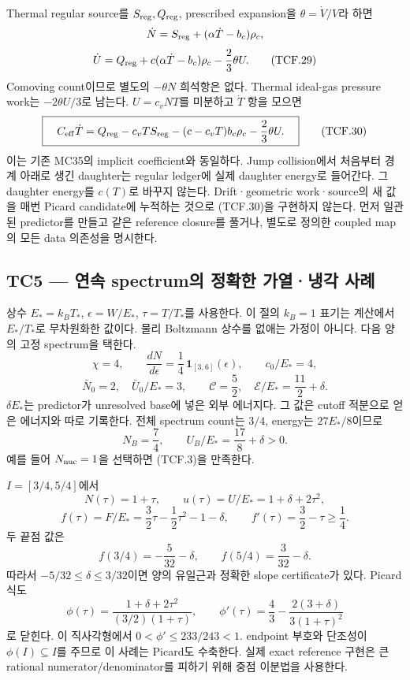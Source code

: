 \documentclass[11pt,a4paper]{article}
\begin{document}
Thermal regular source를 \(S_{\rm reg},Q_{\rm reg}\), prescribed expansion을 \(\theta=\dot V/V\)라 하면 \[
\dot N=S_{\rm reg}+(\alpha\dot T-b_c)\rho_c,
\] \[
\dot U=Q_{\rm reg}+c(\alpha\dot T-b_c)\rho_c
-\frac23\theta U.
\tag{TCF.29}
\] Comoving count이므로 별도의 \(-\theta N\) 희석항은 없다. Thermal ideal-gas pressure work는 \(-2\theta U/3\)로 남는다. \(U=c_vNT\)를 미분하고 \(\dot T\) 항을 모으면 \[
\boxed{\quad
C_{\rm eff}\dot T=
Q_{\rm reg}-c_vTS_{\rm reg}
-(c-c_vT)b_c\rho_c-\frac23\theta U .
\quad}
\tag{TCF.30}
\] 이는 기존 MC35의 implicit coefficient와 동일하다. Jump collision에서 처음부터 경계 아래로 생긴 daughter는 regular ledger에 실제 daughter energy로 들어간다. 그 daughter energy를 \(c(T)\)로 바꾸지 않는다. Drift·geometric work·source의 새 값을 매번 Picard candidate에 누적하는 것으로 (TCF.30)을 구현하지 않는다. 먼저 일관된 predictor를 만들고 같은 reference closure를 풀거나, 별도로 정의한 coupled map의 모든 data 의존성을 명시한다.

\hypertarget{tc5-uxc5f0uxc18d-spectrumuxc758-uxc815uxd655uxd55c-uxac00uxc5f4uxb0c9uxac01-uxc0acuxb840}{%
\subsection{TC5 --- 연속 spectrum의 정확한 가열·냉각 사례}\label{tc5-uxc5f0uxc18d-spectrumuxc758-uxc815uxd655uxd55c-uxac00uxc5f4uxb0c9uxac01-uxc0acuxb840}}

상수 \(E_*=k_BT_*\), \(\epsilon=W/E_*\), \(\tau=T/T_*\)를 사용한다. 이 절의 \(k_B=1\) 표기는 계산에서 \(E_*/T_*\)로 무차원화한 값이다. 물리 Boltzmann 상수를 없애는 가정이 아니다. 다음 양의 고정 spectrum을 택한다. \[
\chi=4,\qquad
\frac{dN}{d\epsilon}=\frac14\,\mathbf1_{[3,6]}(\epsilon),\qquad
c_0/E_*=4,
\] \[
\bar N_0=2,\quad \bar U_0/E_*=3,\qquad
\mathscr C=\frac52,\quad
\mathscr E/E_*=\frac{11}{2}+\delta .
\tag{TCF.31}
\] \(\delta E_*\)는 predictor가 unresolved base에 넣은 외부 에너지다. 그 값은 cutoff 적분으로 얻은 에너지와 따로 기록한다. 전체 spectrum count는 \(3/4\), energy는 \(27E_*/8\)이므로 \[
N_B=\frac74,\qquad U_B/E_*=\frac{17}{8}+\delta>0 .
\tag{TCF.32}
\] 예를 들어 \(N_{\rm nuc}=1\)을 선택하면 (TCF.3)을 만족한다.

\(I=[3/4,5/4]\)에서 \[
N(\tau)=1+\tau,\qquad u(\tau)=U/E_*=1+\delta+2\tau^2,
\] \[
f(\tau)=F/E_*=
\frac32\tau-\frac12\tau^2-1-\delta,\qquad
f'(\tau)=\frac32-\tau\ge\frac14.
\tag{TCF.33}
\] 두 끝점 값은 \[
f(3/4)=-\frac5{32}-\delta,\qquad
f(5/4)=\frac3{32}-\delta .
\tag{TCF.34}
\] 따라서 \(-5/32\le\delta\le3/32\)이면 양의 유일근과 정확한 slope certificate가 있다. Picard 식도 \[
\phi(\tau)=\frac{1+\delta+2\tau^2}{(3/2)(1+\tau)},\qquad
\phi'(\tau)=\frac43-\frac{2(3+\delta)}{3(1+\tau)^2}
\tag{TCF.35}
\] 로 닫힌다. 이 직사각형에서 \(0<\phi'\le233/243<1\). endpoint 부호와 단조성이 \(\phi(I)\subseteq I\)를 주므로 이 사례는 Picard도 수축한다. 실제 exact reference 구현은 큰 rational numerator/denominator를 피하기 위해 중점 이분법을 사용한다.
\end{document}
